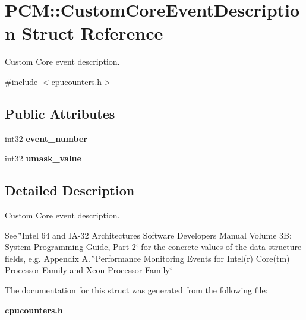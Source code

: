 \section{P\+C\+M\+:\+:Custom\+Core\+Event\+Description Struct Reference}
\label{structPCM_1_1CustomCoreEventDescription}


Custom Core event description.  




{\ttfamily \#include $<$cpucounters.\+h$>$}

\subsection*{Public Attributes}
\begin{DoxyCompactItemize}
\item 
int32 {\bfseries event\+\_\+number}\label{structPCM_1_1CustomCoreEventDescription_adfdbff9cf7c5be78450884b7adbd48fb}

\item 
int32 {\bfseries umask\+\_\+value}\label{structPCM_1_1CustomCoreEventDescription_a317a16603c27cf815fa62d88e7fd2f61}

\end{DoxyCompactItemize}


\subsection{Detailed Description}
Custom Core event description. 

See \char`\"{}\+Intel 64 and I\+A-\/32 Architectures Software Developers Manual Volume 3\+B\+:
\+System Programming Guide, Part 2\char`\"{} for the concrete values of the data structure fields, e.\+g. Appendix A. \char`\"{}\+Performance Monitoring Events for Intel(r) Core(tm) Processor Family
and Xeon Processor Family\char`\"{} 

The documentation for this struct was generated from the following file\+:\begin{DoxyCompactItemize}
\item 
{\bf cpucounters.\+h}\end{DoxyCompactItemize}
